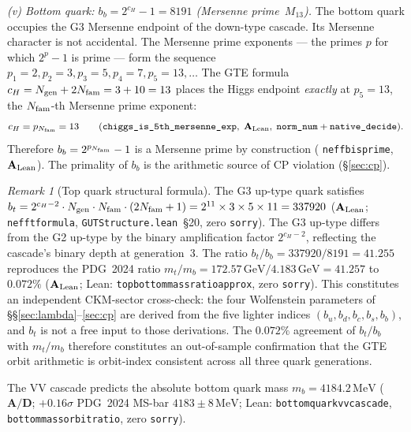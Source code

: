 \documentclass[11pt]{article}
\theoremstyle{remark}
\newtheorem{remark}[theorem]{Remark}
\newcommand{\Ngen}{N_{\rm gen}}
\newcommand{\Nfam}{N_{\rm fam}}
\newcommand{\cH}{c_H}
\newcommand{\lean}[1]{%
  \penalty-100
  \begingroup\def\_{\textunderscore\allowbreak}\texttt{#1}\endgroup}
\newcommand{\bu}{b_u}
\newcommand{\bd}{b_d}
\newcommand{\bc}{b_c}
\newcommand{\bs}{b_s}
\newcommand{\bb}{b_b}
\newcommand{\bt}{b_t}
\newcommand{\CatAL}{\ensuremath{\textbf{A}_{\rm Lean}}}
\newcommand{\CatAD}{\textbf{A/D}}
\begin{document}
\medskip

\noindent\textit{(v) Bottom quark: $\bb = 2^{\cH}-1 = 8191$ (Mersenne prime~$M_{13}$).}\quad
The bottom quark occupies the G3 Mersenne endpoint of the down-type cascade.
Its Mersenne character is not accidental.
The Mersenne prime exponents --- the primes $p$ for which $2^p-1$ is prime --- form the
sequence $p_1=2, p_2=3, p_3=5, p_4=7, p_5=13, \ldots$
The GTE formula $\cH = \Ngen+2\Nfam = 3+10 = 13$ places the Higgs endpoint \emph{exactly}
at $p_5 = 13$, the $\Nfam$-th Mersenne prime exponent:
\[
  \cH = p_{\Nfam} = 13
  \qquad (\lean{chiggs\_is\_5th\_mersenne\_exp},\;\CatAL,\;\texttt{norm\_num}+\texttt{native\_decide}).
\]
Therefore $\bb = 2^{p_{\Nfam}}-1$ is a Mersenne prime by construction
(\lean{neff\_b\_is\_prime}, $\CatAL$).
The primality of $\bb$ is the arithmetic source of CP violation (\S\ref{sec:cp}).

\begin{remark}[Top quark structural formula]
The G3 up-type quark satisfies
$\bt = 2^{\cH-2}\cdot\Ngen\cdot\Nfam\cdot(2\Nfam+1) = 2^{11}\times 3\times 5\times 11 = 337920$
($\CatAL$; \lean{neff\_t\_formula}, \texttt{GUTStructure.lean}~\S20, zero \texttt{sorry}).
The G3 up-type differs from the G2 up-type by the binary amplification factor
$2^{\cH-2}$, reflecting the cascade's binary depth at generation~3.
The ratio $\bt/\bb = 337920/8191 = 41.255$ reproduces the PDG~2024 ratio
$m_t/m_b = 172.57\,\mathrm{GeV}/4.183\,\mathrm{GeV} = 41.257$ to $0.072\%$
($\CatAL$; Lean: \lean{top\_bottom\_mass\_ratio\_approx}, zero \texttt{sorry}).
This constitutes an independent CKM-sector cross-check: the four Wolfenstein
parameters of \S\S\ref{sec:lambda}--\ref{sec:cp} are derived from the five lighter
indices $(\bu, \bd, \bc, \bs, \bb)$, and $\bt$ is not a free input to those
derivations.
The $0.072\%$ agreement of $\bt/\bb$ with $m_t/m_b$ therefore constitutes an
out-of-sample confirmation that the GTE orbit arithmetic is orbit-index consistent
across all three quark generations.

The VV cascade predicts the absolute bottom quark mass
$m_b = 4184.2\,\mathrm{MeV}$ ($\CatAD$; $+0.16\sigma$ PDG~2024 MS-bar
$4183 \pm 8\,\mathrm{MeV}$; Lean: \lean{bottom\_quark\_vv\_cascade},
\lean{bottom\_mass\_orbit\_ratio}, zero \texttt{sorry}).
\end{remark}
\end{document}
